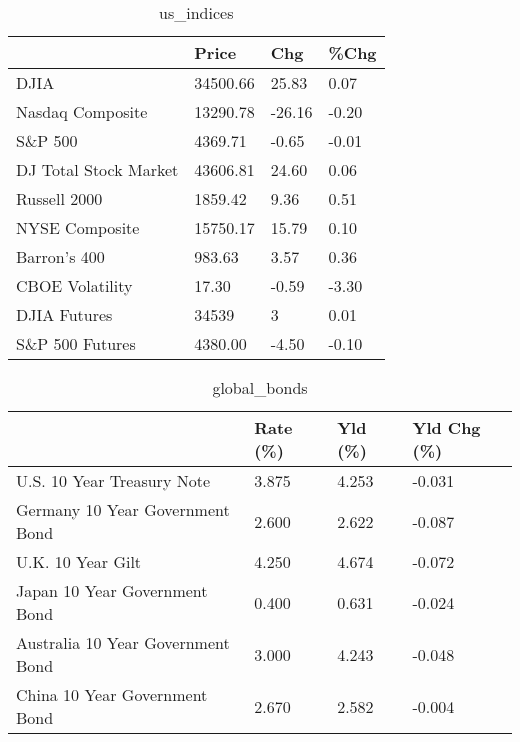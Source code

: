 \documentclass{article}%
\begin{document}
%


\begin{table}[htbp]%
\caption{us\_indices}%
\centering%
\begin{adjustbox}{width=1\textwidth}%
\begin{tabular}{llll}
\toprule
                      &    Price &    Chg &  \%Chg \\
\midrule
                 DJIA & 34500.66 &  25.83 &  0.07 \\
     Nasdaq Composite & 13290.78 & -26.16 & -0.20 \\
              S\&P 500 &  4369.71 &  -0.65 & -0.01 \\
DJ Total Stock Market & 43606.81 &  24.60 &  0.06 \\
         Russell 2000 &  1859.42 &   9.36 &  0.51 \\
       NYSE Composite & 15750.17 &  15.79 &  0.10 \\
         Barron's 400 &   983.63 &   3.57 &  0.36 \\
      CBOE Volatility &    17.30 &  -0.59 & -3.30 \\
         DJIA Futures &    34539 &      3 &  0.01 \\
      S\&P 500 Futures &  4380.00 &  -4.50 & -0.10 \\
\bottomrule
\end{tabular}
%
\end{adjustbox}%
\end{table}

%


\begin{table}[htbp]%
\caption{global\_bonds}%
\centering%
\begin{adjustbox}{width=1\textwidth}%
\begin{tabular}{llll}
\toprule
                                  & Rate (\%) & Yld (\%) & Yld Chg (\%) \\
\midrule
       U.S. 10 Year Treasury Note &    3.875 &   4.253 &      -0.031 \\
  Germany 10 Year Government Bond &    2.600 &   2.622 &      -0.087 \\
                U.K. 10 Year Gilt &    4.250 &   4.674 &      -0.072 \\
    Japan 10 Year Government Bond &    0.400 &   0.631 &      -0.024 \\
Australia 10 Year Government Bond &    3.000 &   4.243 &      -0.048 \\
    China 10 Year Government Bond &    2.670 &   2.582 &      -0.004 \\
\bottomrule
\end{tabular}
%
\end{adjustbox}%
\end{table}
\end{document}

